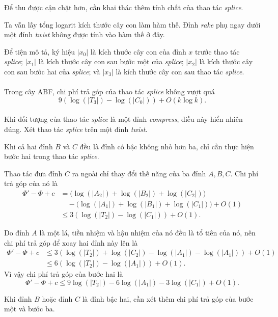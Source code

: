 \documentclass[11pt]{article}
\begin{document}
Để thu được cận chặt hơn, cần khai thác thêm tính chất của thao tác
\emph{splice}.

Ta vẫn lấy tổng logarit kích thước cây con làm hàm thế. Đỉnh \emph{rake} phụ
ngay dưới một đỉnh \emph{twist} không được tính vào hàm thế ở đây.

Để tiện mô tả, ký hiệu \(|x_0|\) là kích thước cây con của đỉnh \(x\) trước
thao tác \emph{splice}; \(|x_1|\) là kích thước cây con sau bước một của
\emph{splice}; \(|x_2|\) là kích thước cây con sau bước hai của
\emph{splice}; và \(|x_3|\) là kích thước cây con sau thao tác
\emph{splice}.

\paragraph{}
Trong cây ABF, chi phí trả góp của thao tác \emph{splice} không vượt quá
\[
  9(\log(|T_3|)-\log(|C_0|))+O(k\log k).
\]

\paragraph{}
Khi đối tượng của thao tác \emph{splice} là một đỉnh \emph{compress}, điều
này hiển nhiên đúng. Xét thao tác \emph{splice} trên một đỉnh \emph{twist}.

Khi cả hai đỉnh \(B\) và \(C\) đều là đỉnh có bậc không nhỏ hơn ba, chỉ cần
thực hiện bước hai trong thao tác \emph{splice}.

Thao tác đưa đỉnh \(C\) ra ngoài chỉ thay đổi thế năng của ba đỉnh \(A,B,C\).
Chi phí trả góp của nó là
\[
\begin{aligned}
\Phi'-\Phi+c
&=\bigl(\log(|A_2|)+\log(|B_2|)+\log(|C_2|)\bigr)\\
&\quad-\bigl(\log(|A_1|)+\log(|B_1|)+\log(|C_1|)\bigr)+O(1)\\
&\le 3(\log(|T_2|)-\log(|C_1|))+O(1).
\end{aligned}
\]

Do đỉnh \(A\) là một lá, tiền nhiệm và hậu nhiệm của nó đều là tổ tiên của
nó, nên chi phí trả góp để xoay hai đỉnh này lên là
\[
\begin{aligned}
\Phi'-\Phi+c
&\le 3(\log(|T_2|)+\log(|C_2|)
  -\log(|A_1|)-\log(|A_1|))+O(1)\\
&\le 6(\log(|T_2|)-\log(|A_1|))+O(1).
\end{aligned}
\]
Vì vậy chi phí trả góp của bước hai là
\[
  \Phi'-\Phi+c
  \le 9\log(|T_2|)-6\log(|A_1|)-3\log(|C_1|)+O(1).
\]

Khi đỉnh \(B\) hoặc đỉnh \(C\) là đỉnh bậc hai, cần xét thêm chi phí trả góp
của bước một và bước ba.
\end{document}
